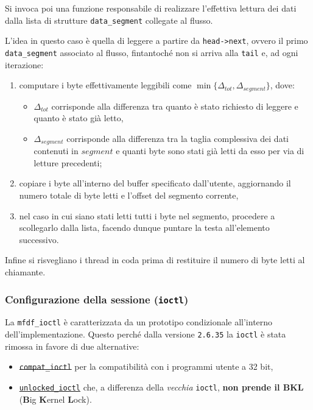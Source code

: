 \documentclass{article}
\begin{document}
Si invoca poi una funzione responsabile di realizzare l'effettiva lettura dei dati dalla lista di strutture \texttt{data\_segment} collegate al flusso.

L'idea in questo caso è quella di leggere a partire da \texttt{head->next}, ovvero il primo \texttt{data\_segment} associato al flusso, fintantoché non si arriva alla \texttt{tail} e, ad ogni iterazione:
\begin{enumerate}
        \item computare i byte effettivamente leggibili come $\min\lbrace\Delta_{tot}, \Delta_{segment}\rbrace$, dove:
                \begin{itemize}
                        \item $\Delta_{tot}$ corrisponde alla differenza tra quanto è stato richiesto di leggere e quanto è stato già letto,
                        \item $\Delta_{segment}$ corrisponde alla differenza tra la taglia complessiva dei dati contenuti in $segment$ e quanti byte sono stati già letti da esso per via di letture precedenti;
                \end{itemize}
        \item copiare i byte all'interno del buffer specificato dall'utente, aggiornando il numero totale di byte letti e l'offset del segmento corrente,
        \item nel caso in cui siano stati letti tutti i byte nel segmento, procedere a scollegarlo dalla lista, facendo dunque puntare la testa all'elemento successivo.
\end{enumerate}

Infine si risvegliano i thread in coda prima di restituire il numero di byte letti al chiamante.
\subsubsection{Configurazione della sessione (\texttt{ioctl})}
La \texttt{mfdf\_ioctl} è caratterizzata da un prototipo condizionale all'interno dell'implementazione. Questo perché dalla versione \texttt{2.6.35} la \texttt{ioctl} è stata rimossa in favore di due alternative:
\begin{itemize}
        \item \st{\texttt{compat\_ioctl}} per la compatibilità con i programmi utente a 32 bit,
        \item \ul{\texttt{unlocked\_ioctl}} che, a differenza della \textit{vecchia} \texttt{ioctl}, \textbf{non prende il BKL} (\textbf{B}ig \textbf{K}ernel \textbf{L}ock).
\end{itemize}
\end{document}
